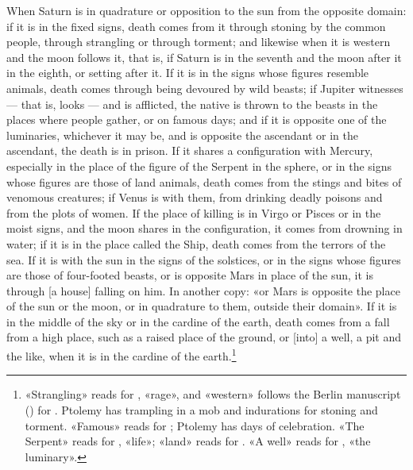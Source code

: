 \documentclass[11pt]{article}
\newcommand{\Fol}[1]{\marginpar{\footnotesize\color{gray}f.\,#1}}
\begin{document}
\par \Fol{74v}When Saturn is in quadrature or opposition to the sun from the opposite domain: if it is in the fixed signs, death comes from it through stoning by the common people, through strangling or through torment; and likewise when it is western and the moon follows it, that is, if Saturn is in the seventh and the moon after it in the eighth, or setting after it. If it is in the signs whose figures resemble animals, death comes through being devoured by wild beasts; if Jupiter witnesses — that is, looks — and is afflicted, the native is thrown to the beasts in the places where people gather, or on famous days; and if it is opposite one of the luminaries, whichever it may be, and is opposite the ascendant or in the ascendant, the death is in prison. If it shares a configuration with Mercury, especially in the place of the figure of the Serpent in the sphere, or in the signs whose figures are those of land animals, death comes from the stings and bites of venomous creatures; if Venus is with them, from drinking deadly poisons and from the plots of women. If the place of killing is in Virgo or Pisces or in the moist signs, and the moon shares in the configuration, it comes from drowning in water; if it is in the place called the Ship, death comes from the terrors of the sea. If it is with the sun in the signs of the solstices, or in the signs whose figures are those of four-footed beasts, or is opposite Mars in place of the sun, it is through [a house] falling on him. In another copy: «or Mars is opposite the place of the sun or the moon, or in quadrature to them, outside their domain». If it is in the middle of the sky or in the cardine of the earth, death comes from a fall from a high place, such as a raised place of the ground, or [into] a well, a pit and the like, when it is in the cardine of the earth.\footnote{«Strangling» reads  for , «rage», and «western» follows the Berlin manuscript () for . Ptolemy has trampling in a mob and indurations for stoning and torment. «Famous» reads  for ; Ptolemy has days of celebration. «The Serpent» reads  for , «life»; «land» reads  for . «A well» reads  for , «the luminary».}\par
\end{document}

